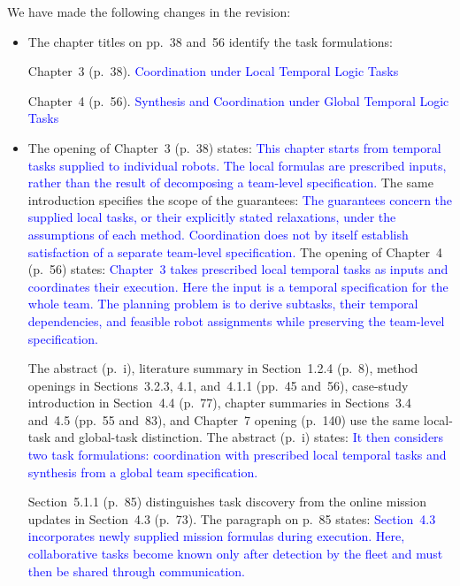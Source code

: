 \documentclass[11pt]{article}
\newcommand{\change}[1]{\textcolor{blue}{#1}}
\begin{document}
We have made the following changes in the revision:
\begin{itemize}
\item The chapter titles on pp.~38 and~56 identify the task formulations:

Chapter~3 (p.~38). \change{Coordination under Local Temporal Logic Tasks}

Chapter~4 (p.~56). \change{Synthesis and Coordination under Global Temporal Logic Tasks}

\item The opening of Chapter~3 (p.~38) states:
\change{This chapter starts from temporal tasks supplied to individual robots.
The local formulas are prescribed inputs, rather than the result of
decomposing a team-level specification.}
The same introduction specifies the scope of the guarantees:
\change{The guarantees concern the supplied local tasks, or their explicitly stated
relaxations, under the assumptions of each method. Coordination does not
by itself establish satisfaction of a separate team-level specification.}
The opening of Chapter~4 (p.~56) states:
\change{Chapter~3 takes prescribed local temporal tasks as
inputs and coordinates their execution. Here the input is a temporal
specification for the whole team. The planning problem is to derive subtasks,
their temporal dependencies, and feasible robot assignments while preserving
the team-level specification.}

The abstract (p.~i), literature summary in Section~1.2.4 (p.~8), method
openings in Sections~3.2.3, 4.1, and~4.1.1 (pp.~45 and~56), case-study
introduction in Section~4.4 (p.~77), chapter summaries in Sections~3.4 and~4.5
(pp.~55 and~83), and Chapter~7 opening (p.~140) use the same local-task
and global-task distinction. The abstract (p.~i) states:
\change{It then considers two task formulations: coordination with prescribed
local temporal tasks and synthesis from a global team specification.}

Section~5.1.1 (p.~85) distinguishes task discovery from the online mission
updates in Section~4.3 (p.~73). The paragraph on p.~85 states:
\change{Section~4.3 incorporates newly supplied mission formulas during execution. Here,
collaborative tasks become known only after detection by the fleet and must
then be shared through communication.}
\end{itemize}
\end{document}
